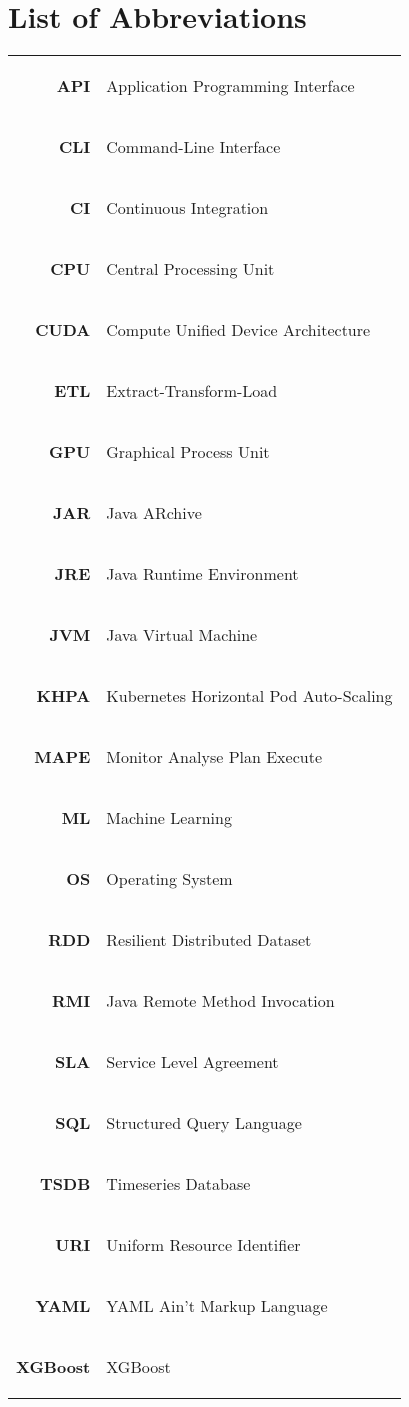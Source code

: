 \chapter*{List of Abbreviations}
%
\begin{tabular}{rl}
\hypertarget{abbr:api}{\textbf{API}} & Application Programming Interface
\\
\hypertarget{abbr:cli}{\textbf{CLI}} & Command-Line Interface
\\
\hypertarget{abbr:ci}{\textbf{CI}} & Continuous Integration
\\
\hypertarget{abbr:cpu}{\textbf{CPU}} & Central Processing Unit
\\
\hypertarget{abbr:cuda}{\textbf{CUDA}} & Compute Unified Device Architecture
\\
\hypertarget{abbr:etl}{\textbf{ETL}} & Extract-Transform-Load
\\
\hypertarget{abbr:gpu}{\textbf{GPU}} & Graphical Process Unit
\\
\hypertarget{abbr:jar}{\textbf{JAR}} & Java ARchive
\\
\hypertarget{abbr:jre}{\textbf{JRE}} & Java Runtime Environment
\\
\hypertarget{abbr:jvm}{\textbf{JVM}} & Java Virtual Machine
\\
\hypertarget{abbr:khpa}{\textbf{KHPA}} & Kubernetes Horizontal Pod Auto-Scaling
\\
\hypertarget{abbr:mape}{\textbf{MAPE}} & Monitor Analyse Plan Execute
\\
\hypertarget{abbr:ml}{\textbf{ML}} & Machine Learning
\\
\hypertarget{abbr:os}{\textbf{OS}} & Operating System
\\
\hypertarget{abbr:rdd}{\textbf{RDD}} & Resilient Distributed Dataset
\\
\hypertarget{abbr:rmi}{\textbf{RMI}} & Java Remote Method Invocation
\\
\hypertarget{abbr:sla}{\textbf{SLA}} & Service Level Agreement
\\
\hypertarget{abbr:sql}{\textbf{SQL}} & Structured Query Language
\\
\hypertarget{abbr:tsdb}{\textbf{TSDB}} & Timeseries Database
\\
\hypertarget{abbr:uri}{\textbf{URI}} & Uniform Resource Identifier
\\
\hypertarget{abbr:yaml}{\textbf{YAML}} & YAML Ain't Markup Language
\\
\hypertarget{abbr:xgboost}{\textbf{XGBoost}} & XGBoost
\end{tabular}